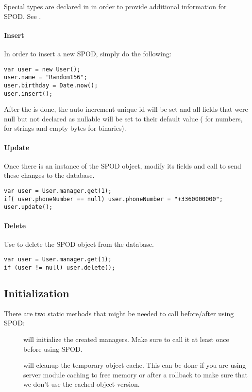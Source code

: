 Special types are declared in  in order to provide additional information for SPOD. See .

\paragraph{Insert}
In order to insert a new SPOD, simply do the following:

\begin{lstlisting} 
var user = new User();
user.name = "Random156";
user.birthday = Date.now();
user.insert();
\end{lstlisting} 

After the  is done, the auto increment unique id will be set and all fields that were null but not declared as nullable will be set to their default value ( for numbers,  for strings and empty bytes for binaries).

\paragraph{Update}
Once there is an instance of the SPOD object, modify its fields and call  to send these changes to the database.

\begin{lstlisting} 
var user = User.manager.get(1);
if( user.phoneNumber == null) user.phoneNumber = "+3360000000";
user.update();
\end{lstlisting} 

\paragraph{Delete}
Use  to delete the SPOD object from the database.

\begin{lstlisting} 
var user = User.manager.get(1);
if (user != null) user.delete();
\end{lstlisting} 

\subsection{Initialization}
\label{std-spod-initialization}

There are two static methods that might be needed to call before/after using SPOD:

\begin{description}
	\item[] will initialize the created managers. Make sure to call it at least once before using SPOD.
	\item[] will cleanup the temporary object cache. This can be done if you are using server module caching to free memory or after a rollback to make sure that we don't use the cached object version.
\end{description}

